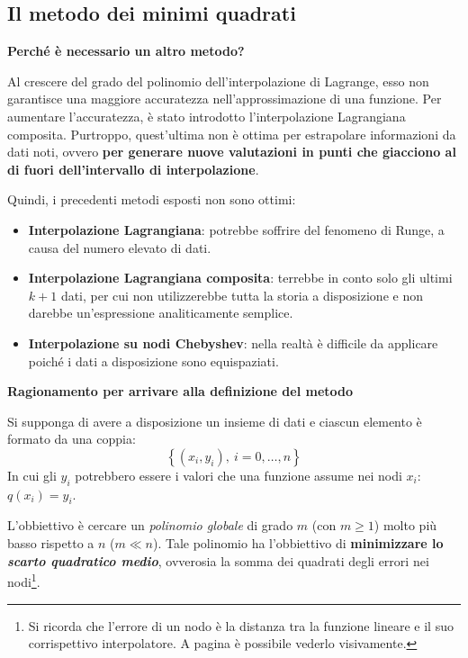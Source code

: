 \subsection{Il metodo dei minimi quadrati}

\begin{flushleft}
	\textcolor{Green3}{ \textbf{Perché è necessario un altro metodo?}}
\end{flushleft}
Al crescere del grado del polinomio dell'interpolazione di Lagrange, esso non garantisce una maggiore accuratezza nell'approssimazione di una funzione. Per aumentare l'accuratezza, è stato introdotto l'interpolazione Lagrangiana composita. Purtroppo, quest'ultima non è ottima per estrapolare informazioni da dati noti, ovvero \textbf{per generare nuove valutazioni in punti che giacciono al di fuori dell'intervallo di interpolazione}.

\highspace
Quindi, i precedenti metodi esposti non sono ottimi:
\begin{itemize}
	\item \textbf{Interpolazione Lagrangiana}: potrebbe soffrire del fenomeno di Runge, a causa del numero elevato di dati.
	
	\item \textbf{Interpolazione Lagrangiana composita}: terrebbe in conto solo gli ultimi $k+1$ dati, per cui non utilizzerebbe tutta la storia a disposizione e non darebbe un'espressione analiticamente semplice.
	
	\item \textbf{Interpolazione su nodi Chebyshev}: nella realtà è difficile da applicare poiché i dati a disposizione sono equispaziati.
\end{itemize}

\highspace
\begin{flushleft}
	\textcolor{Red2}{ \textbf{Ragionamento per arrivare alla definizione del metodo}}
\end{flushleft}
Si supponga di avere a disposizione un insieme di dati e ciascun elemento è formato da una coppia:
\begin{equation*}
	\left\{\left(x_{i}, y_{i}\right), \: i = 0, \dots, n\right\}
\end{equation*}
In cui gli $y_{i}$ potrebbero essere i valori che una funzione assume nei nodi $x_{i}$: $q\left(x_{i}\right) = y_{i}$.

\highspace
L'obbiettivo è cercare un \emph{polinomio globale} di grado $m$ (con $m \ge 1$) molto più basso rispetto a $n$ ($m \ll n$). Tale polinomio ha l'obbiettivo di \textbf{minimizzare lo \emph{scarto quadratico medio}}, ovverosia la somma dei quadrati degli errori nei nodi\footnote{Si ricorda che l'errore di un nodo è la distanza tra la funzione lineare e il suo corrispettivo interpolatore. A pagina \pageref{fig: stima dell'errore massimo dell'interpolatore Lagrangiano} è possibile vederlo visivamente.}.

